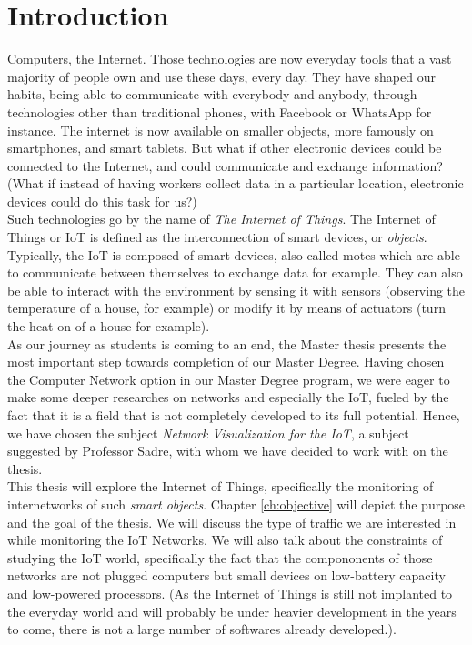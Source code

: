 \chapter*{Introduction}

Computers, the Internet. Those technologies are now everyday tools that a vast majority of people own and use these days, every day. They have shaped our habits, being able to communicate with everybody and anybody, through technologies other than traditional phones, with Facebook or WhatsApp for instance. The internet is now available on smaller objects, more famously on smartphones, and smart tablets. But what if other electronic devices could be connected to the Internet, and could communicate and exchange information? (What if instead of having workers collect data in a particular location, electronic devices could do this task for us?)\\

Such technologies go by the name of \textit{The Internet of Things}. The Internet of Things or IoT is defined as the interconnection of smart devices, or \textit{objects}. Typically, the IoT is composed of smart devices, also called motes which are able to communicate between themselves to exchange data for example. They can also be able to interact with the environment by sensing it with sensors (observing the temperature of a house, for example) or modify it by means of actuators (turn the heat on of a house for example).\\

As our journey as students is coming to an end, the Master thesis presents the most important step towards completion of our Master Degree.  Having chosen the Computer Network option in our Master Degree program, we were eager to make some deeper researches on networks and especially the IoT, fueled by the fact that it is a field that is not completely developed to its full potential. Hence, we have chosen the subject \textit{Network Visualization for the IoT}, a subject suggested by Professor Sadre, with whom we have decided to work with on the thesis. \\

This thesis will explore the Internet of Things, specifically the monitoring of internetworks of such \textit{smart objects}. Chapter \ref{ch:objective} will depict the purpose and the goal of the thesis. We will discuss the type of traffic we are interested in while monitoring the IoT Networks. We will also talk about the constraints of studying the IoT world, specifically the fact that the compononents of those networks are not plugged computers but small devices on low-battery capacity and low-powered processors. (As the Internet of Things is still not implanted to the everyday world and will probably be under heavier development in the years to come, there is not a large number of softwares already developed.).\\

